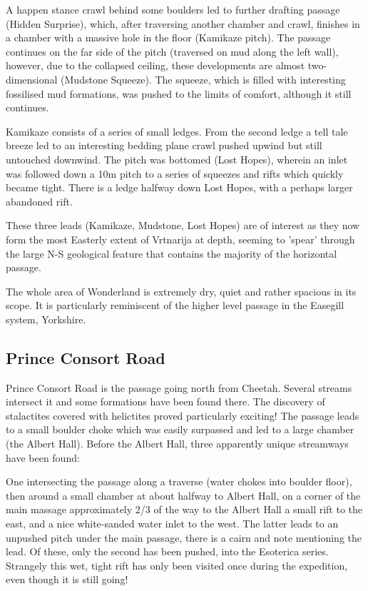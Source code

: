 A happen stance crawl behind some boulders led to further drafting
passage (Hidden Surprise), which, after traversing another chamber
and crawl, finishes in a chamber with a massive hole in the floor
(Kamikaze pitch). The passage continues on the far side of the pitch
(traversed on mud along the left wall), however, due to the collapsed
ceiling, these developments are almost two-dimensional (Mudstone Squeeze).
The squeeze, which is filled with interesting fossilised mud formations,
was pushed to the limits of comfort, although it still continues.

Kamikaze consists of a series of small ledges. From the second ledge
a tell tale breeze led to an interesting bedding plane crawl pushed
upwind but still untouched downwind. The pitch was bottomed (Lost
Hopes), wherein an inlet was followed down a 10m pitch to a series
of squeezes and rifts which quickly became tight. There is a ledge
halfway down Lost Hopes, with a perhaps larger abandoned rift.

These three leads (Kamikaze, Mudstone, Lost Hopes) are of interest
as they now form the most Easterly extent of Vrtnarija at depth, seeming
to 'spear' through the large N-S geological feature that contains
the majority of the horizontal passage.

The whole area of Wonderland is extremely dry, quiet and rather spacious
in its scope. It is particularly reminiscent of the higher level passage
in the Easegill system, Yorkshire.


\subsection{Prince Consort Road}

Prince Consort Road is the passage going north from Cheetah. Several
streams intersect it and some formations have been found there. The
discovery of stalactites covered with helictites proved particularly
exciting! The passage leads to a small boulder choke which was easily
surpassed and led to a large chamber (the Albert Hall). Before the
Albert Hall, three apparently unique streamways have been found:

One intersecting the passage along a traverse (water chokes into boulder
floor), then around a small chamber at about halfway to Albert Hall,
on a corner of the main massage approximately 2/3 of the way to the
Albert Hall a small rift to the east, and a nice white-sanded water
inlet to the west. The latter leads to an unpushed pitch under the
main passage, there is a cairn and note mentioning the lead. Of these,
only the second has been pushed, into the Esoterica series. Strangely
this wet, tight rift has only been visited once during the expedition,
even though it is still going!

